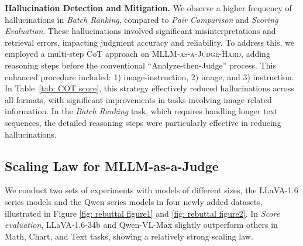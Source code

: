 \noindent\textbf{Hallucination Detection and Mitigation.}
We observe a higher frequency of hallucinations in \textit{Batch Ranking}, compared to \textit{Pair Comparison} and \textit{Scoring Evaluation}. These hallucinations involved significant misinterpretations and retrieval errors, impacting judgment accuracy and reliability. To address this, we employed a multi-step CoT approach on \textsc{MLLM-as-a-Judge-Hard}, adding reasoning steps before the conventional ``Analyze-then-Judge'' process. This enhanced procedure included: 1) image-instruction, 2) image, and 3) instruction. In Table~\ref{tab: COT score}, this strategy effectively reduced hallucinations across all formats, with significant improvements in tasks involving image-related information. In the \textit{Batch Ranking} task, which requires handling longer text sequences, the detailed reasoning steps were particularly effective in reducing hallucinations.

\subsection{Scaling Law for MLLM-as-a-Judge}
We conduct two sets of experiments with models of different sizes, the LLaVA-1.6 series models and the Qwen series models in four newly added datasets, illustrated in Figure \ref{fig: rebuttal figure1} and \ref{fig: rebuttal figure2}. In \textit{Score evaluation}, LLaVA-1.6-34b and Qwen-VL-Max slightly outperform others in Math, Chart, and Text tasks, showing a relatively strong scaling law. 

\begin{table}[]
\vspace{-0.5em}
\centering
\renewcommand\arraystretch{1.1}
\caption{
Reduction of hallucinations in \textsc{MLLM-as-a-Judge-Hard} through additional CoT steps compared to normal setting.
}
\label{tab: COT score}
\vspace{-16pt}
\end{table}

